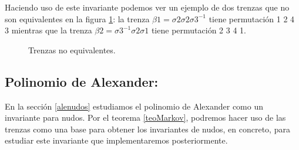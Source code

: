Haciendo uso de este invariante podemos ver un ejemplo de dos trenzas que no son equivalentes en la figura \ref{perm2}: la trenza $\beta1 = \sigma2\sigma2\sigma3^{-1}$ tiene permutación 1 2 4 3 mientras que la trenza $\beta2 = \sigma3^{-1}\sigma2\sigma1$ tiene permutación 2 3 4 1.\\ 
	\begin{figure}[h!]
		\centering
		\caption{Trenzas no equivalentes.}
		\label{perm2} 
	\end{figure}


\bigskip
\subsection{Polinomio de Alexander:}\label{invtren3}
En la sección \ref{alenudos} estudiamos el polinomio de Alexander como un invariante para nudos. Por el teorema \ref{teoMarkov}, podremos hacer uso de las trenzas como una base para obtener los invariantes de nudos, en concreto, para estudiar este invariante que implementaremos posteriormente. \\

